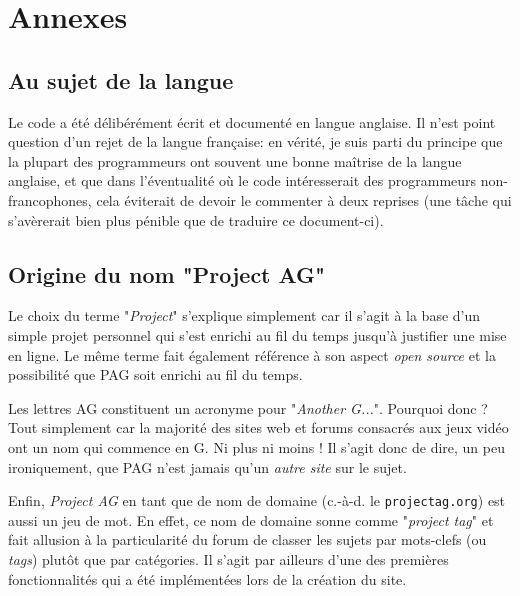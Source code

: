 \chapter{Annexes}\label{annexes}

\section{Au sujet de la langue}

Le code a été délibérément écrit et documenté en langue anglaise. Il n'est point question d'un 
rejet de la langue française: en vérité, je suis parti du principe que la plupart des 
programmeurs ont souvent une bonne maîtrise de la langue anglaise, et que dans l'éventualité où 
le code intéresserait des programmeurs non-francophones, cela éviterait de devoir le commenter 
à deux reprises (une tâche qui s'avèrerait bien plus pénible que de traduire ce document-ci).

\section{Origine du nom "Project AG"}

Le choix du terme "\textit{Project}" s'explique simplement car il s'agit à la base d'un simple 
projet personnel qui s'est enrichi au fil du temps jusqu'à justifier une mise en ligne. Le même 
terme fait également référence à son aspect \textit{open source} et la possibilité que PAG soit 
enrichi au fil du temps.

Les lettres AG constituent un acronyme pour "\textit{Another G...}". Pourquoi donc ? Tout 
simplement car la majorité des sites web et forums consacrés aux jeux vidéo ont un nom qui 
commence en G. Ni plus ni moins ! Il s'agit donc de dire, un peu ironiquement, que PAG n'est 
jamais qu'un \textit{autre site} sur le sujet.

Enfin, \textit{Project AG} en tant que de nom de domaine (c.-à-d. le \texttt{projectag.org}) est 
aussi un jeu de mot. En effet, ce nom de domaine sonne comme "\textit{project tag}" et fait 
allusion à la particularité du forum de classer les sujets par mots-clefs (ou \textit{tags}) 
plutôt que par catégories. Il s'agit par ailleurs d'une des premières fonctionnalités qui a été 
implémentées lors de la création du site.
